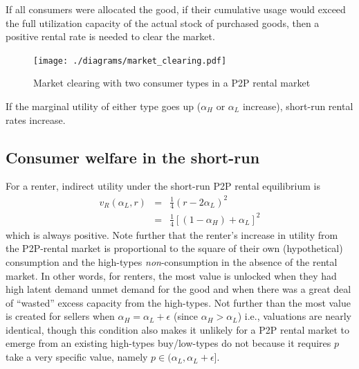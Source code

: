 \documentclass[11pt]{article}
\begin{document}
\begin{prop}
If all consumers were allocated the good, if their cumulative usage would exceed the full utilization capacity of the actual stock of purchased goods, then a positive rental rate is needed to clear the market. 
\end{prop} 

\begin{figure}
\caption{Market clearing with two consumer types in a P2P rental market} 
\centering
\label{fig:market_clearing} 
\begin{minipage}{0.90 \linewidth}
\texttt{[image: ./diagrams/market\_clearing.pdf]}
\end{minipage} 
\end{figure}

\begin{prop}
If the marginal utility of either type goes up ($\alpha_H$ or $\alpha_L$ increase), short-run rental rates increase. 
\end{prop} 

\subsection{Consumer welfare in the short-run} 
For a renter, indirect utility under the short-run P2P rental equilibrium is
\begin{eqnarray} 
v_R(\alpha_L, r) &=& \frac{1}{4}\left(r - 2\alpha_L \right)^2  \\
                 &=& \frac{1}{4} \left[ (1-\alpha_H) + \alpha_L \right]^2
\end{eqnarray} 
which is always positive. 
Note further that the renter's increase in utility from the P2P-rental market is proportional to the square of their own (hypothetical) consumption and the high-types \emph{non}-consumption in the absence of the rental market. 
In other words, for renters, the most value is unlocked when they had high latent demand unmet demand for the good and when there was a great deal of ``wasted'' excess capacity from the high-types. 
Not further than the most value is created for sellers when $\alpha_H = \alpha_L + \epsilon$ (since $\alpha_H > \alpha_L$) i.e., valuations are nearly identical, though this condition also makes it unlikely for a P2P rental market to emerge from an existing high-types buy/low-types do not because it requires $p$ take a very specific value, namely $p \in (\alpha_L, \alpha_L + \epsilon]$. 
\end{document}
